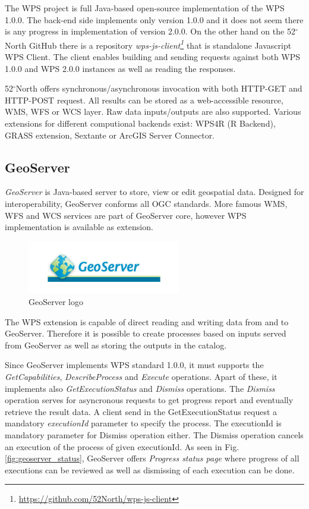 \documentclass[12pt,a4paper]{article}
\begin{document}
The  WPS project is full Java-based open-source implementation of the WPS 1.0.0. The back-end side implements only version 1.0.0 and it
does not seem there is any progress in implementation of version 2.0.0. On the other hand on the 52$^{\circ}$North GitHub there is a
repository \textit{wps-js-client\footnote{\url{https://github.com/52North/wps-js-client}}} that is standalone Javascript WPS Client. 
The client enables building and sending requests against both WPS 1.0.0 and WPS 2.0.0 instances as well as reading the responses.

52$^{\circ}$North offers synchronous/asynchronous invocation with both HTTP-GET and HTTP-POST request. All results can be stored as
a web-accessible resource, WMS, WFS or WCS layer. Raw data inputs/outputs are also supported. Various extensions for different
computional backends exist: WPS4R (R Backend), GRASS extension, Sextante or ArcGIS Server Connector.

\subsection{GeoServer}
\textit{GeoServer} is Java-based server to store, view or edit geospatial data. Designed for interoperability, GeoServer conforms
all OGC standards. More famous WMS, WFS and WCS services are part of GeoServer core, however WPS implementation is available as 
extension.

\begin{figure}[h!]
\centering
\includegraphics[width=0.6\textwidth]{img/geoserver.jpg}
\caption{GeoServer logo}
\label{fig:geoserver_logo}
\end{figure}

The WPS extension is capable of direct reading and writing data from and to GeoServer. Therefore it is possible to create processes
based on inputs served from GeoServer as well as storing the outputs in the catalog.

Since GeoServer implements WPS standard 1.0.0, it must supports the \textit{GetCapabilities}, \textit{DescribeProcess} and \textit{Execute}
operations. Apart of these, it implements also \textit{GetExecutionStatus} and \textit{Dismiss} operations. The \textit{Dismiss} operation
serves for asyncronous requests to get progress report and eventually retrieve the result data. A client send in the GetExecutionStatus
request a mandatory \textit{executionId} parameter to specify the process. The executionId is mandatory parameter for Dismiss operation
either. The Dismiss operation cancels an execution of the process of given executionId. As seen in Fig. \ref{fig:geoserver_status},
GeoServer offers \textit{Progress status page} where progress of all executions can be reviewed as well as dismissing of each execution
can be done.
\end{document}
